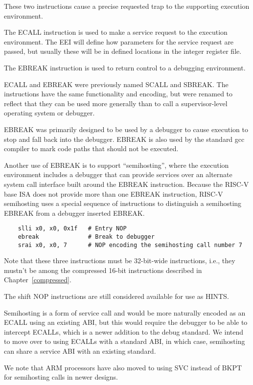 These two instructions cause a precise requested trap to the
supporting execution environment.

The ECALL instruction is used to make a service request to the
execution environment.  The EEI will define how parameters for the
service request are passed, but usually these will be in defined
locations in the integer register file.

The EBREAK instruction is used to return control to a debugging
environment.

\begin{commentary}
ECALL and EBREAK were previously named SCALL and SBREAK.  The
instructions have the same functionality and encoding, but were
renamed to reflect that they can be used more generally than to call a
supervisor-level operating system or debugger.
\end{commentary}

\begin{commentary}
  EBREAK was primarily designed to be used by a debugger to cause
  execution to stop and fall back into the debugger. EBREAK is also
  used by the standard gcc compiler to mark code paths that should not
  be executed.

  Another use of EBREAK is to support ``semihosting'', where the
  execution environment includes a debugger that can provide services
  over an alternate system call interface built around the EBREAK
  instruction.  Because the RISC-V base ISA does not provide more than
  one EBREAK instruction, RISC-V semihosting uses a special sequence of
  instructions to distinguish a semihosting EBREAK from a debugger
  inserted EBREAK.
\begin{verbatim}
    slli x0, x0, 0x1f   # Entry NOP
    ebreak              # Break to debugger
    srai x0, x0, 7      # NOP encoding the semihosting call number 7
\end{verbatim}
   Note that these three instructions must be 32-bit-wide instructions,
   i.e., they mustn't be among the compressed 16-bit instructions
   described in Chapter~\ref{compressed}.

   The shift NOP instructions are still considered available for use as
   HINTS.

   Semihosting is a form of service call and would be more naturally
   encoded as an ECALL using an existing ABI, but this would require
   the debugger to be able to intercept ECALLs, which is a newer
   addition to the debug standard.  We intend to move over to using
   ECALLs with a standard ABI, in which case, semihosting can share a
   service ABI with an existing standard.

   We note that ARM processors have also moved to using SVC instead of
   BKPT for semihosting calls in newer designs.
\end{commentary}

